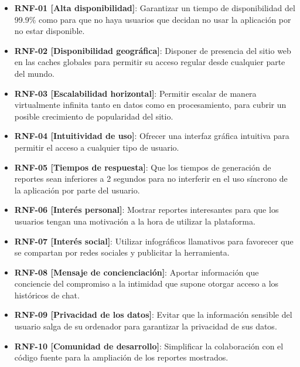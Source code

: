 
\begin{itemize}
    \item \textbf{RNF-01 [Alta disponibilidad]}: Garantizar un tiempo de disponibilidad del 99.9\% como para que no haya usuarios que decidan no usar la aplicación por no estar disponible.
    \item \textbf{RNF-02 [Disponibilidad geográfica]}: Disponer de presencia del sitio web en las caches globales para permitir su acceso regular desde cualquier parte del mundo.
    \item \textbf{RNF-03 [Escalabilidad horizontal]}: Permitir escalar de manera virtualmente infinita tanto en datos como en procesamiento, para cubrir un posible crecimiento de popularidad del sitio.
    \item \textbf{RNF-04 [Intuitividad de uso]}: Ofrecer una interfaz gráfica intuitiva para permitir el acceso a cualquier tipo de usuario.
    \item \textbf{RNF-05 [Tiempos de respuesta]}: Que los tiempos de generación de reportes sean inferiores a 2 segundos para no interferir en el uso síncrono de la aplicación por parte del usuario.
    \item \textbf{RNF-06 [Interés personal]}: Mostrar reportes interesantes para que los usuarios tengan una motivación a la hora de utilizar la plataforma.
    \item \textbf{RNF-07 [Interés social]}: Utilizar infográficos llamativos para favorecer que se compartan por redes sociales y publicitar la herramienta.
    \item \textbf{RNF-08 [Mensaje de concienciación]}: Aportar información que conciencie del compromiso a la intimidad que supone otorgar acceso a los históricos de chat.
    \item \textbf{RNF-09 [Privacidad de los datos]}: Evitar que la información sensible del usuario salga de su ordenador para garantizar la privacidad de sus datos.
    \item \textbf{RNF-10 [Comunidad de desarrollo]}: Simplificar la colaboración con el código fuente para la ampliación de los reportes mostrados.
\end{itemize}
